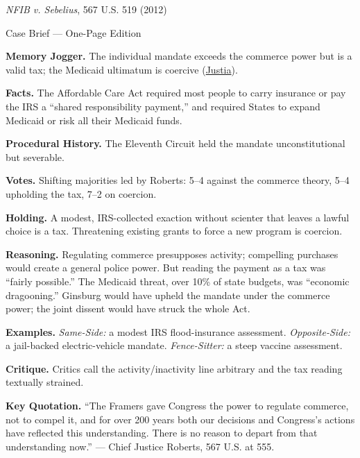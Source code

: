 \documentclass[12pt]{article}
\begin{document}
\begin{center}
{\Large \textit{NFIB v. Sebelius}, 567 U.S. 519 (2012)\par}
\vspace{0.3em}
{\normalsize Case Brief --- One-Page Edition\par}
\end{center}

\textbf{Memory Jogger.} The individual mandate exceeds the commerce power but is a valid tax; the Medicaid ultimatum is coercive (\href{https://supreme.justia.com/cases/federal/us/567/519/}{Justia}).

\textbf{Facts.} The Affordable Care Act required most people to carry insurance or pay the IRS a ``shared responsibility payment,'' and required States to expand Medicaid or risk all their Medicaid funds.

\textbf{Procedural History.} The Eleventh Circuit held the mandate unconstitutional but severable.

\textbf{Votes.} Shifting majorities led by Roberts: 5--4 against the commerce theory, 5--4 upholding the tax, 7--2 on coercion.

\textbf{Holding.} A modest, IRS-collected exaction without scienter that leaves a lawful choice is a tax. Threatening existing grants to force a new program is coercion.

\textbf{Reasoning.} Regulating commerce presupposes activity; compelling purchases would create a general police power. But reading the payment as a tax was ``fairly possible.'' The Medicaid threat, over 10\% of state budgets, was ``economic dragooning.'' Ginsburg would have upheld the mandate under the commerce power; the joint dissent would have struck the whole Act.

\textbf{Examples.} \emph{Same-Side:} a modest IRS flood-insurance assessment. \emph{Opposite-Side:} a jail-backed electric-vehicle mandate. \emph{Fence-Sitter:} a steep vaccine assessment.

\textbf{Critique.} Critics call the activity/inactivity line arbitrary and the tax reading textually strained.

\textbf{Key Quotation.} ``The Framers gave Congress the power to regulate commerce, not to compel it, and for over 200 years both our decisions and Congress's actions have reflected this understanding. There is no reason to depart from that understanding now.'' --- Chief Justice Roberts, 567 U.S. at 555.
\end{document}
